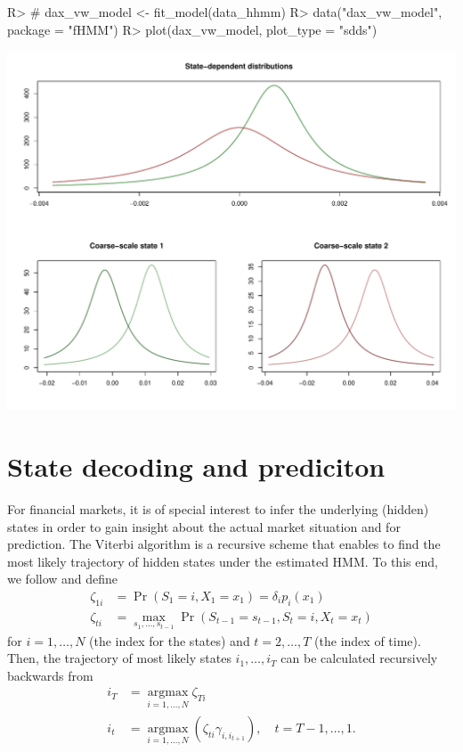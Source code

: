 \documentclass[article,shortnames]{jss}
\begin{document}
%
\begin{Schunk}
\begin{Sinput}
R> # dax_vw_model <- fit_model(data_hhmm)
R> data("dax_vw_model", package = "fHMM")
R> plot(dax_vw_model, plot_type = "sdds")
\end{Sinput}
\end{Schunk}
\includegraphics{fhmm_oelschlaeger_adam_michels-hhmm-sdds}
%

\section{State decoding and prediciton} \label{sec:state_decoding_and_prediction} %

For financial markets, it is of special interest to infer the underlying (hidden) states in order to gain insight about the actual market situation and for prediction. The Viterbi algorithm \citep{for73} is a recursive scheme that enables to find the most likely trajectory of hidden states under the estimated HMM. To this end, we follow \cite{zuc16} and define
\begin{align*}
  \zeta_{1i} &= \Pr(S_1 = i, X_1 = x_1) = \delta_i p_i(x_1) \\
  \zeta_{ti} &= \operatorname*{max}_{s_1, \ldots, s_{t-1}} \Pr(S_{t-1} = s_{t-1}, S_t = i, X_t = x_t)
\end{align*}
for $i = 1, \ldots, N$ (the index for the states) and $t = 2, \ldots, T$ (the index of time). Then, the trajectory of most likely states $i_1, \ldots, i_T$ can be calculated recursively backwards from
\begin{align*}
  i_T &= \operatorname*{argmax}_{i = 1, \ldots, N} \zeta_{Ti} \\
  i_t &= \operatorname*{argmax}_{i = 1, \ldots, N} (\zeta_{ti} \gamma_{i, i_{t+1}}), \quad t = T-1, \ldots, 1.
\end{align*}
\end{document}
